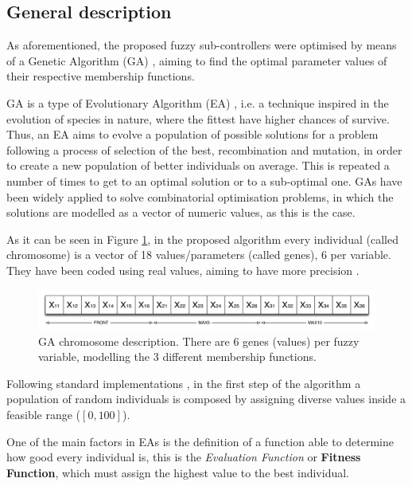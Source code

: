 \documentclass[10pt,journal,compsoc]{IEEEtran}
\begin{document}
\subsection{General description}

As aforementioned, the proposed fuzzy sub-controllers were optimised by means of a Genetic Algorithm (GA) \cite{GAs_Goldberg89}, aiming to find the optimal parameter values of their respective membership functions.

GA is a type of Evolutionary Algorithm (EA) \cite{EAs_Back96}, i.e. a technique inspired in the evolution of species in nature, where the fittest have higher chances of survive. Thus, an EA aims to evolve a population of possible solutions for a problem following a process of selection of the best, recombination and mutation, in order to create a new population of better individuals on average. This is repeated a number of times to get to an optimal solution or to a sub-optimal one.
GAs have been widely applied to solve combinatorial optimisation problems, in which the solutions are modelled as a vector of numeric values, as this is the case.

As it can be seen in Figure \ref{fig:cromosome}, in the proposed algorithm every individual (called chromosome) is a vector of 18 values/parameters (called genes), 6 per variable. They have been coded using real values, aiming to have more precision \cite{elsayed13}. 

 \begin{figure}[!ht]	
 	\begin{center}
 		\includegraphics[width=12cm]{fig/chromosome2.png}
 		\caption{GA chromosome description. There are 6 genes (values) per fuzzy variable, modelling the 3 different membership functions.}
 		\label{fig:cromosome}	
 	\end{center}	
 \end{figure}

Following standard implementations \cite{GAs_Goldberg89}, in the first step of the algorithm \cite{salem_evo17} a population of random individuals is composed by assigning diverse values inside a feasible range ($[0,100]$).

One of the main factors in EAs is the definition of a function able to determine how good every individual is, this is the \textit{Evaluation Function} or \textbf{Fitness Function}, which must assign the highest value to the best individual.
\end{document}
